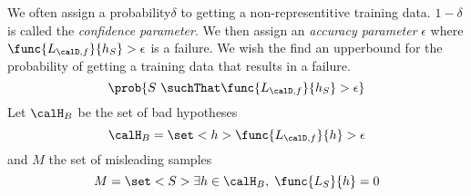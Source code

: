 We often assign a probability\(\delta\) to getting a non-representitive training data. \(1- \delta\) is called the \textit{confidence parameter}. We then assign an \textit{accuracy parameter} \(\epsilon\) where \(\func{L_{\calD, f}}{h_S} > \epsilon\) is a failure. We wish the find an upperbound for the probability of getting a training data that results in a failure. 
\begin{equation*}
    \prob{S \ \suchThat \func{L_{\calD, f}}{h_S} > \epsilon}
\end{equation*}
Let \(\calH_B\) be the set of bad hypotheses
\begin{equation*}
    \calH_B = \set<h>{\func{L_{\calD, f}}{h} > \epsilon}
\end{equation*}
and \(M\) the set of misleading samples 
\begin{equation*}
    M = \set<S>{\exists h \in \calH_B, \; \func{L_{S}}{h} = 0}
\end{equation*}
